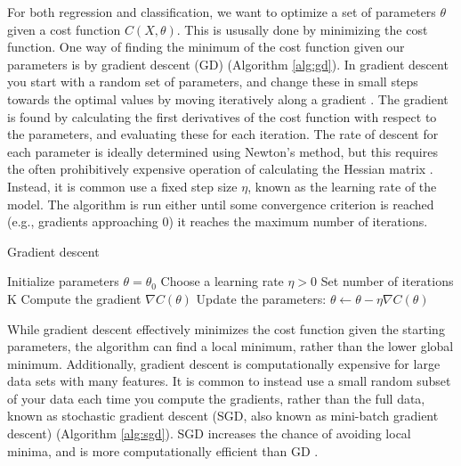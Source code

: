For both regression and classification, we want to optimize a set of parameters $\theta$ given a cost function $C(X, \theta)$. This is ususally done by minimizing the cost function. One way of finding the minimum of the cost function given our parameters is by gradient descent (GD) (Algorithm \ref{alg:gd}). In gradient descent you start with a random set of parameters, and change these in small steps towards the optimal values by moving iteratively along a gradient \cite{Goodfellow:2016:deep_learning}. The gradient is found by calculating the first derivatives of the cost function with respect to the parameters, and evaluating these for each iteration. The rate of descent for each parameter is ideally determined using Newton's method, but this requires the often prohibitively expensive operation of calculating the Hessian matrix \cite{battiti1992:newtons_method}. Instead, it is common use a fixed step size $\eta$, known as the learning rate of the model. The algorithm is run either until some convergence criterion is reached (e.g., gradients approaching 0) it reaches the maximum number of iterations.

\begin{algorithm}
\caption{Gradient descent}\label{alg:gd}
\begin{algorithmic}[1]
    \STATE Initialize parameters $\theta = \theta_0$
    \STATE Choose a learning rate $\eta > 0$
    \STATE Set number of iterations K
        \STATE Compute the gradient $\nabla C(\theta)$
        \STATE Update the parameters: $\theta \leftarrow \theta - \eta \nabla C(\theta)$
    \ENDFOR
\end{algorithmic}
\end{algorithm}

While gradient descent effectively minimizes the cost function given the starting parameters, the algorithm can find a local minimum, rather than the lower global minimum. Additionally, gradient descent is computationally expensive for large data sets with many features. It is common to instead use a small random subset of your data each time you compute the gradients, rather than the full data, known as stochastic gradient descent (SGD, also known as mini-batch gradient descent) (Algorithm \ref{alg:sgd}). SGD increases the chance of avoiding local minima, and is more computationally efficient than GD \cite{Goodfellow:2016:deep_learning}.

